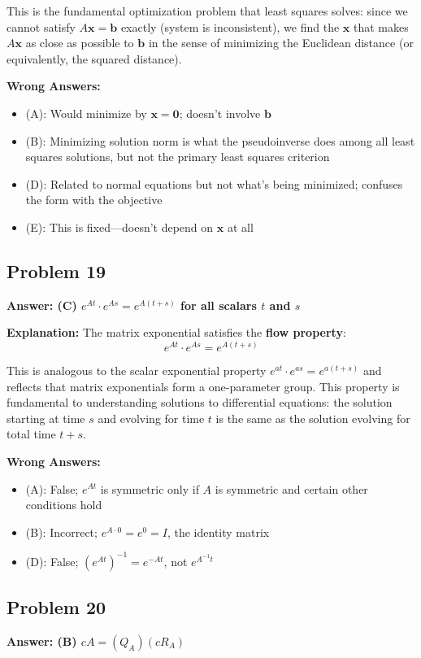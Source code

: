 \documentclass[12pt]{amsart}
\newcommand{\correct}[1]{{\color{correctgreen}\textbf{#1}}}
\begin{document}
{This is the fundamental optimization problem that least squares solves: since we cannot satisfy $A\mathbf{x} = \mathbf{b}$ exactly (system is inconsistent), we find the $\mathbf{x}$ that makes $A\mathbf{x}$ as close as possible to $\mathbf{b}$ in the sense of minimizing the Euclidean distance (or equivalently, the squared distance).

\textbf{Wrong Answers:}
\begin{itemize}
\item (A): Would minimize by $\mathbf{x} = \mathbf{0}$; doesn't involve $\mathbf{b}$
\item (B): Minimizing solution norm is what the pseudoinverse does among all least squares solutions, but not the primary least squares criterion
\item (D): Related to normal equations but not what's being minimized; confuses the form with the objective
\item (E): This is fixed—doesn't depend on $\mathbf{x}$ at all
\end{itemize}

\subsection*{Problem 19}
\correct{Answer: (C) $e^{At} \cdot e^{As} = e^{A(t+s)}$ for all scalars $t$ and $s$}

\textbf{Explanation:} The matrix exponential satisfies the \textbf{flow property}:
$$e^{At} \cdot e^{As} = e^{A(t+s)}$$

This is analogous to the scalar exponential property $e^{at} \cdot e^{as} = e^{a(t+s)}$ and reflects that matrix exponentials form a one-parameter group. This property is fundamental to understanding solutions to differential equations: the solution starting at time $s$ and evolving for time $t$ is the same as the solution evolving for total time $t+s$.

\textbf{Wrong Answers:}
\begin{itemize}
\item (A): False; $e^{At}$ is symmetric only if $A$ is symmetric and certain other conditions hold
\item (B): Incorrect; $e^{A \cdot 0} = e^{0} = I$, the identity matrix
\item (D): False; $(e^{At})^{-1} = e^{-At}$, not $e^{A^{-1}t}$
\end{itemize}

\subsection*{Problem 20}
\correct{Answer: (B) $cA = (Q_A)(cR_A)$}

}
\end{document}
